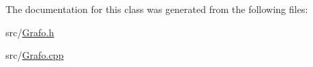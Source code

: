 The documentation for this class was generated from the following files\-:\begin{DoxyCompactItemize}
\item 
src/\hyperlink{Grafo_8h}{Grafo.\-h}\item 
src/\hyperlink{Grafo_8cpp}{Grafo.\-cpp}\end{DoxyCompactItemize}
